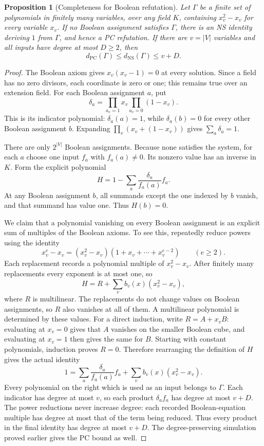 \documentclass[11pt,a4paper,oneside,openany]{book}
\newtheorem{proposition}[theorem]{Proposition}
\theoremstyle{definition}\newtheorem{definition}[theorem]{Definition}
\theoremstyle{remark}\newtheorem{remark}[theorem]{Remark}
\newcommand{\NS}{\mathrm{NS}}\newcommand{\PC}{\mathrm{PC}}
\numberwithin{equation}{chapter}
\begin{document}
\begin{proposition}[Completeness for Boolean refutation]\label{tx:prop:boolean-completeness}
Let $\Gamma$ be a finite set of polynomials in finitely many variables,
over any field $K$, containing $x_v^2-x_v$ for every variable $x_v$.
If no Boolean assignment satisfies $\Gamma$, there is an NS identity
deriving $1$ from $\Gamma$, and hence a PC refutation. If there are
$v=|V|$ variables and all inputs have degree at most $D\ge2$, then
\[
                  d_{\PC}(\Gamma)\le d_{\NS}(\Gamma)\le v+D.
\]
\end{proposition}
\begin{proof}
The Boolean axiom gives $x_v(x_v-1)=0$ at every solution. Since a field
has no zero divisors, each coordinate is zero or one; this remains true
over an extension field. For each Boolean assignment $a$, put
\[
           \delta_a=\prod_{a_v=1}x_v\prod_{a_v=0}(1-x_v).
\]
This is its indicator polynomial: $\delta_a(a)=1$, while
$\delta_a(b)=0$ for every other Boolean assignment $b$. Expanding
$\prod_v(x_v+(1-x_v))$ gives $\sum_a\delta_a=1$.

There are only $2^{|V|}$ Boolean assignments. Because none satisfies the
system, for each $a$ choose one input $f_a$ with $f_a(a)\ne0$. Its
nonzero value has an inverse in $K$. Form the explicit polynomial
\[
                  H=1-\sum_a\frac{\delta_a}{f_a(a)}f_a.
\]
At any Boolean assignment $b$, all summands except the one indexed by
$b$ vanish, and that summand has value one. Thus $H(b)=0$.

We claim that a polynomial vanishing on every Boolean assignment is
an explicit sum of multiples of the Boolean axioms. To see this,
repeatedly reduce powers using the identity
\[
 x_v^e-x_v=(x_v^2-x_v)(1+x_v+\cdots+x_v^{e-2})\qquad(e\ge2).
\]
Each replacement records a polynomial multiple of $x_v^2-x_v$.
After finitely many replacements every exponent is at most one, so
\[
                  H=R+\sum_v b_v(x)(x_v^2-x_v),
\]
where $R$ is multilinear. The replacements do not change values on
Boolean assignments, so $R$ also vanishes at all of them. A multilinear
polynomial is determined by these values. For a direct induction, write
$R=A+x_v B$: evaluating at $x_v=0$ gives that $A$ vanishes on the
smaller Boolean cube, and evaluating at $x_v=1$ then gives the same for
$B$. Starting with constant polynomials, induction proves $R=0$.
Therefore rearranging the definition of $H$ gives the actual identity
\[
       1=\sum_a\frac{\delta_a}{f_a(a)}f_a
                            +\sum_v b_v(x)(x_v^2-x_v).
\]
Every polynomial on the right which is used as an input belongs to
$\Gamma$. Each indicator has degree at most $v$, so each product
$\delta_a f_a$ has degree at most $v+D$. The power reductions never
increase degree: each recorded Boolean-equation multiple has degree
at most that of the term being reduced. Thus every product in the
final identity has degree at most $v+D$. The degree-preserving
simulation proved earlier gives the PC bound as well.
\end{proof}
\end{document}
